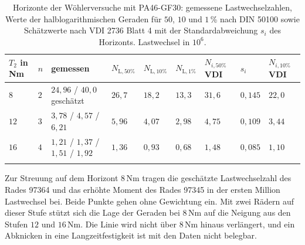 \begin{table}[htbp]
	\caption{Horizonte der Wöhlerversuche mit PA46-GF30: gemessene Lastwechselzahlen, Werte der halblogarithmischen Geraden für $50$, $10$ und $1$\,\% nach DIN 50100 sowie Schätzwerte nach VDI 2736 Blatt 4 mit der Standardabweichung $s_{i}$ des Horizonts. Lastwechsel in $10^{6}$.}
	\label{tab:woehler_horizonte}
	\centering
	\footnotesize
	\setlength{\tabcolsep}{4pt}
	\begin{tabular}{L{1.2cm}L{0.6cm}L{3.2cm}L{1.3cm}L{1.3cm}L{1.3cm}L{1.5cm}L{1.2cm}L{1.5cm}}
		$T_{2}$ in Nm & $n$ & gemessen                                  & $N_{\mathrm{L},50\%}$ & $N_{\mathrm{L},10\%}$ & $N_{\mathrm{L},1\%}$ & $N_{i,50\%}$ VDI & $s_{i}$   & $N_{i,10\%}$ VDI \\
		\hline
		$8$           & $2$ & $24{,}96$ / $40{,}0$ geschätzt            & $26{,}7$              & $18{,}2$              & $13{,}3$             & $31{,}6$         & $0{,}145$ & $22{,}0$         \\
		\hline
		$12$          & $3$ & $3{,}78$ / $4{,}57$ / $6{,}21$            & $5{,}96$              & $4{,}07$              & $2{,}98$             & $4{,}75$         & $0{,}109$ & $3{,}44$         \\
		\hline
		$16$          & $4$ & $1{,}21$ / $1{,}37$ / $1{,}51$ / $1{,}92$ & $1{,}36$              & $0{,}93$              & $0{,}68$             & $1{,}48$         & $0{,}085$ & $1{,}10$         \\
		\hline
	\end{tabular}
\end{table}

Zur Streuung auf dem Horizont $8$\,Nm tragen die geschätzte Lastwechselzahl des Rades 97364 und das erhöhte Moment des Rades 97345 in der ersten Million Lastwechsel bei. Beide Punkte gehen ohne Gewichtung ein. Mit zwei Rädern auf dieser Stufe stützt sich die Lage der Geraden bei $8$\,Nm auf die Neigung aus den Stufen $12$ und $16$\,Nm. Die Linie wird nicht über $8$\,Nm hinaus verlängert, und ein Abknicken in eine Langzeitfestigkeit ist mit den Daten nicht belegbar.


